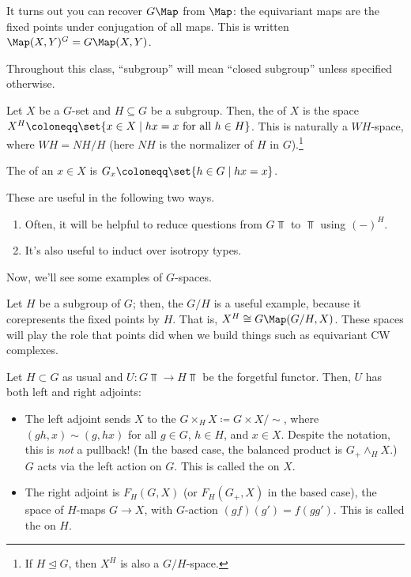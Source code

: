 It turns out you can recover $G\Map$ from $\Map$: the equivariant maps are the fixed points under conjugation of
all maps. This is written $\Map(X,Y)^G = G\Map(X,Y)$.

Throughout this class, ``subgroup'' will mean ``closed subgroup'' unless specified otherwise.
\begin{defn}
Let $X$ be a $G$-set and $H\subseteq G$ be a subgroup. Then, the  of $X$ is the space
$X^H\coloneqq \set{x\in X\mid hx = x\text{ for all } h\in H}$. This is naturally a $WH$-space, where $WH = NH/H$
(here $NH$ is the normalizer of $H$ in $G$).\footnote{If $H\trianglelefteq G$, then $X^H$ is also a
$G/H$-space.}
\end{defn}
\begin{defn}
The  of an $x\in X$ is $G_x\coloneqq \set{h\in G\mid hx = x}$.
\end{defn}
These are useful in the following two ways.
\begin{enumerate}
	\item Often, it will be helpful to reduce questions from $G\Top$ to $\Top$ using $(-)^H$.
	\item It's also useful to induct over isotropy types.
\end{enumerate}
Now, we'll see some examples of $G$-spaces.
\begin{exm}
Let $H$ be a subgroup of $G$; then, the  $G/H$ is a useful example, because it corepresents the
fixed points by $H$. That is, $X^H \cong G\Map(G/H, X)$. These spaces will play the role that points did when we
build things such as equivariant CW complexes.
\end{exm}
\begin{exm}
Let $H\subset G$ as usual and $U\colon G\Top\to H\Top$ be the forgetful functor. Then, $U$ has both left and right
adjoints:
\begin{itemize}
	\item The left adjoint sends $X$ to the  $G\times_H X\coloneqq G\times X/\sim$, where
	$(gh, x)\sim (g, hx)$ for all $g\in G$, $h\in H$, and $x\in X$. Despite the notation, this is \emph{not} a
	pullback! (In the based case, the balanced product is $G_+\wedge_H X$.) $G$ acts via the left action on $G$.
	This is called the  on $X$.
	\item The right adjoint is $F_H(G,X)$ (or $F_H(G_+, X)$ in the based case), the space of $H$-maps $G\to X$,
	with $G$-action $(gf)(g') = f(gg')$. This is called the  on $H$.\qedhere
\end{itemize}
\end{exm}
